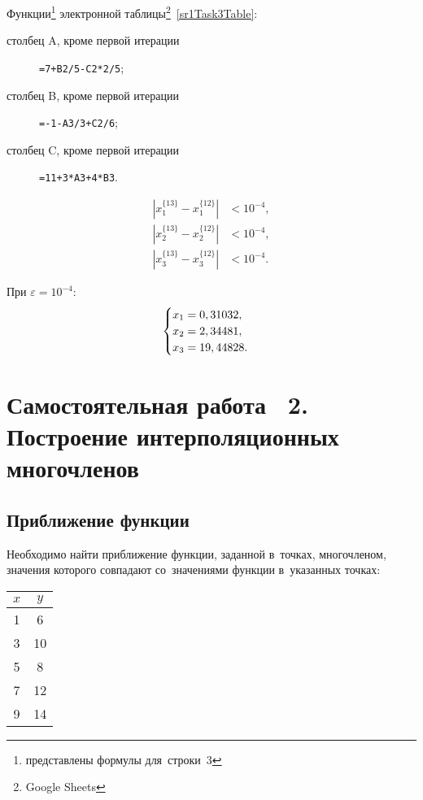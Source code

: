\documentclass[10pt, a4paper, titlepage]{article}
\begin{document}
Функции\footnote{представлены формулы для~строки~3} электронной таблицы\footnote{Google Sheets}~\ref{sr1Task3Table}:
\begin{description}
    \item[столбец A, кроме первой итерации] \verb"=7+B2/5-C2*2/5";
    
    \item[столбец B, кроме первой итерации]  \verb"=-1-A3/3+C2/6";
    
    \item[столбец C, кроме первой итерации] \verb"=11+3*A3+4*B3".
    
\end{description}

\begin{align*}
    \left|x_1^{\{13\}}-x_1^{\{12\}}\right| &< 10^{-4}, \\
    \left|x_2^{\{13\}}-x_2^{\{12\}}\right| &< 10^{-4}, \\
    \left|x_3^{\{13\}}-x_3^{\{12\}}\right| &< 10^{-4}.
\end{align*}

При $\varepsilon=10^{-4}$:
\begin{equation*}
    \begin{cases}
        $$x_1=0,31032$$, \\
        $$x_2=2,34481$$, \\
        $$x_3=19,44828$$.
    \end{cases}
\end{equation*}

\clearpage
\section{Самостоятельная работа \textnumero~2. Построение интерполяционных многочленов}

\subsection*{Приближение функции}

Необходимо найти приближение функции, заданной в~точках, многочленом, значения которого совпадают со~значениями функции в~указанных точках:

\begin{center}
	\begin{tabular}{SS}
		\toprule
		
		$x$ & $y$ \\
		
		\midrule
		
		1 & 6 \\
		3 & 10 \\
		5 & 8 \\
		7 & 12 \\
		9 & 14 \\
		
		\bottomrule
	\end{tabular}
\end{center}
\end{document}
